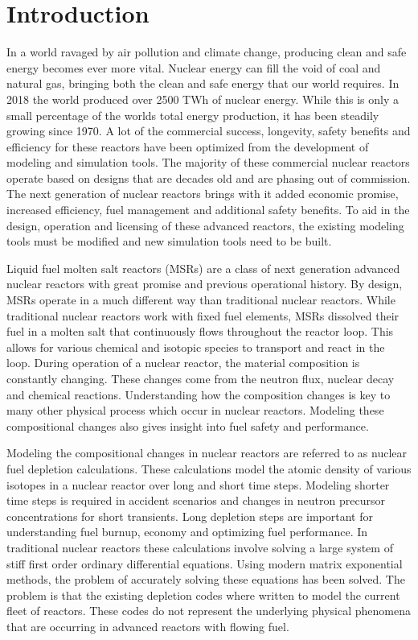 \chapter{Introduction} \label{ch:introduction}

In a world ravaged by air pollution and climate change, producing clean and safe energy becomes ever more vital. Nuclear energy can fill the void of coal and natural gas, bringing both the clean and safe energy that our world requires. In 2018 the world produced over 2500 TWh of nuclear energy. While this is only a small percentage of the worlds total energy production, it has been steadily growing since 1970. A lot of the commercial success, longevity, safety benefits and efficiency for these reactors have been optimized from the development of modeling and simulation tools. The majority of these commercial nuclear reactors operate based on designs that are decades old and are phasing out of commission. The next generation of nuclear reactors brings with it added economic promise, increased efficiency, fuel management and additional safety benefits. To aid in the design, operation and licensing of these advanced reactors, the existing modeling tools must be modified and new simulation tools need to be built. 
 
Liquid fuel molten salt reactors (MSRs) are a class of next generation advanced nuclear reactors with great promise and previous operational history. By design, MSRs operate in a much different way than traditional nuclear reactors. While traditional nuclear reactors work with fixed fuel elements, MSRs dissolved their fuel in a molten salt that continuously flows throughout the reactor loop. This allows for various chemical and isotopic species to transport and react in the loop. During operation of a nuclear reactor, the material composition is constantly changing. These changes come from the neutron flux, nuclear decay and chemical reactions. Understanding how the composition changes is key to many other physical process which occur in nuclear reactors. Modeling these compositional changes also gives insight into fuel safety and performance. 

Modeling the compositional changes in nuclear reactors are referred to as nuclear fuel depletion calculations. These calculations model the atomic density of various isotopes in a nuclear reactor over long and short time steps. Modeling shorter time steps is required in accident scenarios and changes in neutron precursor concentrations for short transients. Long depletion steps are important for understanding fuel burnup, economy and optimizing fuel performance. In traditional nuclear reactors these calculations involve solving a large system of stiff first order ordinary differential equations. Using modern matrix exponential methods, the problem of accurately solving these equations has been solved. The problem is that the existing depletion codes where written to model the current fleet of reactors. These codes do not represent the underlying physical phenomena that are occurring in advanced reactors with flowing fuel. 

